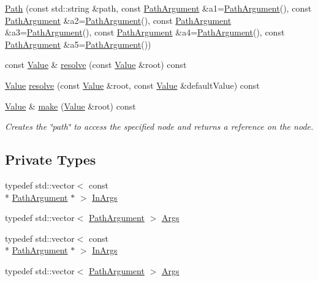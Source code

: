 \begin{DoxyCompactItemize}
\hyperlink{classJson_1_1Path_aaa37a99650e770d0cd680bf53585ec99}{Path} (const std\-::string \&path, const \hyperlink{classJson_1_1PathArgument}{Path\-Argument} \&a1=\hyperlink{classJson_1_1PathArgument}{Path\-Argument}(), const \hyperlink{classJson_1_1PathArgument}{Path\-Argument} \&a2=\hyperlink{classJson_1_1PathArgument}{Path\-Argument}(), const \hyperlink{classJson_1_1PathArgument}{Path\-Argument} \&a3=\hyperlink{classJson_1_1PathArgument}{Path\-Argument}(), const \hyperlink{classJson_1_1PathArgument}{Path\-Argument} \&a4=\hyperlink{classJson_1_1PathArgument}{Path\-Argument}(), const \hyperlink{classJson_1_1PathArgument}{Path\-Argument} \&a5=\hyperlink{classJson_1_1PathArgument}{Path\-Argument}())
\item 
const \hyperlink{classJson_1_1Value}{Value} \& \hyperlink{classJson_1_1Path_a781d60b27fdb34f228018e5b1ce16d59}{resolve} (const \hyperlink{classJson_1_1Value}{Value} \&root) const 
\item 
\hyperlink{classJson_1_1Value}{Value} \hyperlink{classJson_1_1Path_a33d1749770a4cf74e9a3de419bc7febe}{resolve} (const \hyperlink{classJson_1_1Value}{Value} \&root, const \hyperlink{classJson_1_1Value}{Value} \&default\-Value) const 
\item 
\hyperlink{classJson_1_1Value}{Value} \& \hyperlink{classJson_1_1Path_afa04fe0c53033fdc044bc7e3c782c4af}{make} (\hyperlink{classJson_1_1Value}{Value} \&root) const 
\begin{DoxyCompactList}\small\item\em Creates the \char`\"{}path\char`\"{} to access the specified node and returns a reference on the node. \end{DoxyCompactList}\end{DoxyCompactItemize}
\subsection*{Private Types}
\begin{DoxyCompactItemize}
\item 
typedef std\-::vector$<$ const \\*
\hyperlink{classJson_1_1PathArgument}{Path\-Argument} $\ast$ $>$ \hyperlink{classJson_1_1Path_a763349989466ac275fad176708378f95}{In\-Args}
\item 
typedef std\-::vector$<$ \hyperlink{classJson_1_1PathArgument}{Path\-Argument} $>$ \hyperlink{classJson_1_1Path_a27d96232d034d7a78286468676f9cb3e}{Args}
\item 
typedef std\-::vector$<$ const \\*
\hyperlink{classJson_1_1PathArgument}{Path\-Argument} $\ast$ $>$ \hyperlink{classJson_1_1Path_a763349989466ac275fad176708378f95}{In\-Args}
\item 
typedef std\-::vector$<$ \hyperlink{classJson_1_1PathArgument}{Path\-Argument} $>$ \hyperlink{classJson_1_1Path_a27d96232d034d7a78286468676f9cb3e}{Args}
\end{DoxyCompactItemize}
